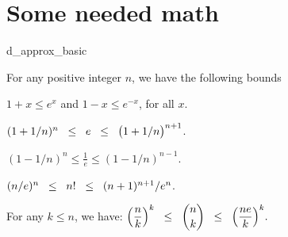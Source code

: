 
%


\ChapterPrefix{}
\ChapterGen{}




\section{Some needed math}


\begin{fragment}{d_approx_basic}
\begin{lemma}
    For any positive integer $n$, we have the following bounds
    \begin{compactenumi}
        \medskip%
        \item $1+x \leq e^x$ \;\;and\;\; $1-x \leq e^{-x}$, for all $x$.

        \medskip
        \item $(1+1/n)^n \mathrel{\;\;\leq\;\;} e \mathrel{\;\;\leq\;\;} \bigl(1+1/n\bigr)^{n+1}$.

        \medskip
        \item $(1-1/n)^n \leq \frac{1}{e} \leq (1-1/n)^{n-1} $.

        \medskip
        \item {}
        $(n/e)^n \mathrel{\;\;\leq\;\;} n! \mathrel{\;\;\leq\;\;} (n+1)^{n+1} / e^n$.

        \item {} For any $k \leq n$, we have:
        \begin{math}
            \ds%
            \pth[]{\frac{n}{k}}^k
            \LEQ%
            \binom{n}{k}%
            \LEQ%
            \pth[]{\frac{n e}{k}}^k.
        \end{math}
    \end{compactenumi}
\end{lemma}
\end{fragment}

